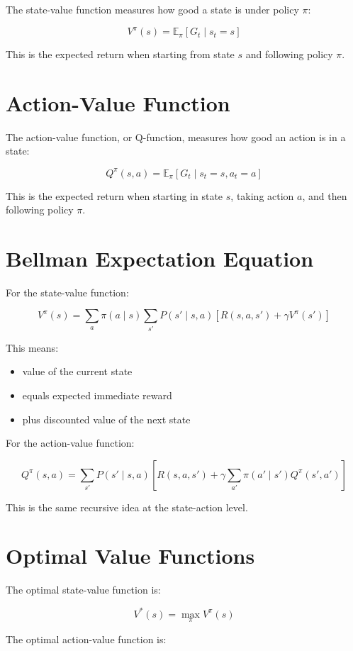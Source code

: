\documentclass[11pt]{article}
\begin{document}
The state-value function measures how good a state is under policy $\pi$:

\[
V^{\pi}(s) = \mathbb{E}_{\pi}[G_t \mid s_t = s]
\]

This is the expected return when starting from state $s$ and following policy $\pi$.

\section{Action-Value Function}

The action-value function, or Q-function, measures how good an action is in a state:

\[
Q^{\pi}(s,a) = \mathbb{E}_{\pi}[G_t \mid s_t = s, a_t = a]
\]

This is the expected return when starting in state $s$, taking action $a$, and then following policy $\pi$.

\section{Bellman Expectation Equation}

For the state-value function:

\[
V^{\pi}(s) = \sum_{a} \pi(a \mid s) \sum_{s'} P(s' \mid s,a)
\left[ R(s,a,s') + \gamma V^{\pi}(s') \right]
\]

This means:
\begin{itemize}
    \item value of the current state
    \item equals expected immediate reward
    \item plus discounted value of the next state
\end{itemize}

For the action-value function:

\[
Q^{\pi}(s,a) = \sum_{s'} P(s' \mid s,a)
\left[ R(s,a,s') + \gamma \sum_{a'} \pi(a' \mid s') Q^{\pi}(s',a') \right]
\]

This is the same recursive idea at the state-action level.

\section{Optimal Value Functions}

The optimal state-value function is:

\[
V^*(s) = \max_{\pi} V^{\pi}(s)
\]

The optimal action-value function is:
\end{document}
